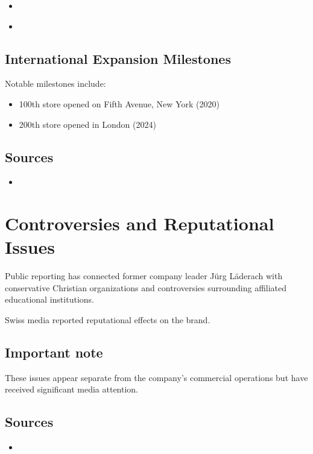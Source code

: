 \begin{itemize}
    \item \cite{wikipediaLaederach}
    \item \cite{laderachHerkunft}
\end{itemize}

\subsection{International Expansion Milestones}

Notable milestones include:

\begin{itemize}
    \item 100th store opened on Fifth Avenue, New York (2020)
    \item 200th store opened in London (2024)
\end{itemize}

\subsection*{Sources}

\begin{itemize}
    \item \cite{laderachPressReleasesUK}
\end{itemize}

\section{Controversies and Reputational Issues}

Public reporting has connected former company leader Jürg Läderach with conservative Christian organizations and controversies surrounding affiliated educational institutions.

Swiss media reported reputational effects on the brand.

\subsection*{Important note}

These issues appear separate from the company's commercial operations but have received significant media attention.

\subsection*{Sources}

\begin{itemize}
    \item \cite{swissinfoLaederachScandal}
\end{itemize}


